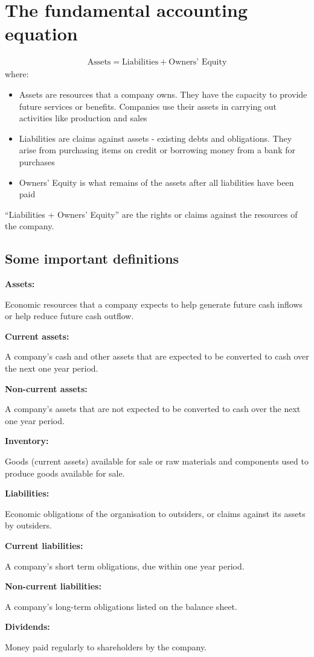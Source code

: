 \section{The fundamental accounting equation}
\begin{gather}
    \textrm{Assets} = \textrm{Liabilities} + \textrm{Owners' Equity}
\end{gather}
where:
\begin{itemize}
    \item Assets are resources that a company owns. They have the capacity to provide future services or benefits. Companies use their assets in carrying out activities like production and sales
    \item Liabilities are claims against assets - existing debts and obligations. They arise from purchasing items on credit or borrowing money from a bank for purchases
    \item Owners' Equity is what remains of the assets after all liabilities have been paid
\end{itemize}
``Liabilities + Owners' Equity'' are the rights or claims against the resources of the company.
\subsection{Some important definitions}
\textbf{Assets:}
\begin{quoting}
    Economic resources that a company expects to help generate future cash inflows or help reduce future cash outflow.
\end{quoting}
\textbf{Current assets:}
\begin{quoting}
    A company's cash and other assets that are expected to be converted to cash over the next one year period.
\end{quoting}
\textbf{Non-current assets:}
\begin{quoting}
    A company's assets that are not expected to be converted to cash over the next one year period.
\end{quoting}
\textbf{Inventory:}
\begin{quoting}
    Goods (current assets) available for sale or raw materials and components used to produce goods available for sale.
\end{quoting}
\textbf{Liabilities:}
\begin{quoting}
    Economic obligations of the organisation to outsiders, or claims against its assets by outsiders.
\end{quoting}
\textbf{Current liabilities:}
\begin{quoting}
    A company's short term obligations, due within one year period.
\end{quoting}
\textbf{Non-current liabilities:}
\begin{quoting}
    A company's long-term obligations listed on the balance sheet.
\end{quoting}
\textbf{Dividends:}
\begin{quoting}
    Money paid regularly to shareholders by the company.
\end{quoting}
